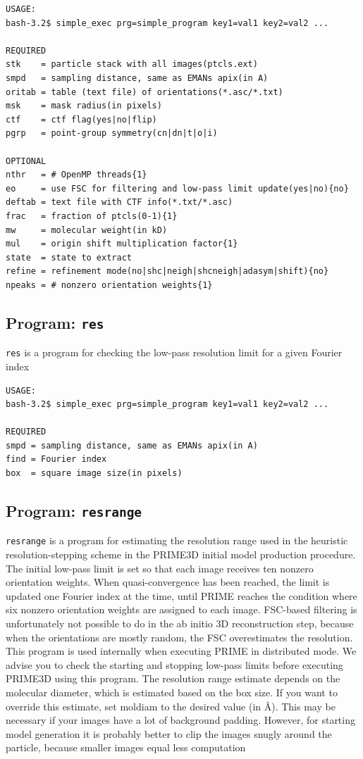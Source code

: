 \documentclass[a4paper,11pt]{article}
\newcommand{\prgname}[1]{\textcolor{NavyBlue}{\texttt{#1}}}
\begin{document}
\begin{verbatim}
USAGE:
bash-3.2$ simple_exec prg=simple_program key1=val1 key2=val2 ...

REQUIRED
stk    = particle stack with all images(ptcls.ext)
smpd   = sampling distance, same as EMANs apix(in A)
oritab = table (text file) of orientations(*.asc/*.txt)
msk    = mask radius(in pixels)
ctf    = ctf flag(yes|no|flip)
pgrp   = point-group symmetry(cn|dn|t|o|i)

OPTIONAL
nthr   = # OpenMP threads{1}
eo     = use FSC for filtering and low-pass limit update(yes|no){no}
deftab = text file with CTF info(*.txt/*.asc)
frac   = fraction of ptcls(0-1){1}
mw     = molecular weight(in kD)
mul    = origin shift multiplication factor{1}
state  = state to extract
refine = refinement mode(no|shc|neigh|shcneigh|adasym|shift){no}
npeaks = # nonzero orientation weights{1}
\end{verbatim}

\subsection{Program: \prgname{res}}
\label{res}
\prgname{res} is a program for checking the low-pass resolution limit for a given Fourier index

\begin{verbatim}
USAGE:
bash-3.2$ simple_exec prg=simple_program key1=val1 key2=val2 ...

REQUIRED
smpd = sampling distance, same as EMANs apix(in A)
find = Fourier index
box  = square image size(in pixels)
\end{verbatim}

\subsection{Program: \prgname{resrange}}
\label{resrange}
\prgname{resrange} is a program for estimating the resolution range used in the heuristic resolution-stepping scheme in the PRIME3D initial model production procedure. The initial low-pass limit is set so that each image receives ten nonzero orientation weights. When quasi-convergence has been reached, the limit is updated one Fourier index at the time, until PRIME reaches the condition where six nonzero orientation weights are assigned to each image. FSC-based filtering is unfortunately not possible to do in the ab initio 3D reconstruction step, because when the orientations are mostly random, the FSC overestimates the resolution. This program is used internally when executing PRIME in distributed mode. We advise you to check the starting and stopping low-pass limits before executing PRIME3D using this program. The resolution range estimate depends on the molecular diameter, which is estimated based on the box size. If you want to override this estimate, set moldiam to the desired value (in \AA{}). This may be necessary if your images have a lot of background padding. However, for starting model generation it is probably better to clip the images snugly around the particle, because smaller images equal less computation
\end{document}
